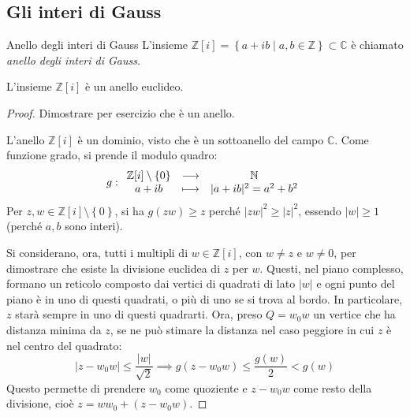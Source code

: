 \documentclass[11pt, a4paper]{scrartcl}
\theoremstyle{definition}
\numberwithin{esempio}{section}
\theoremstyle{definition}
\numberwithin{obs}{section}
\numberwithin{nota}{section}
\numberwithin{equation}{subsection}
\begin{document}
\subsection{Gli interi di Gauss}
\begin{definizione}
	{Anello degli interi di Gauss}{}
	L'insieme $\mathbb{Z}[i] = \left\{ a + ib  \mid a,b \in \mathbb{Z} \right\}\subset \mathbb{C} $ \`e chiamato \textit{anello degli interi di Gauss}.
\end{definizione}
\begin{prop}
	{}{}
	L'insieme $\mathbb{Z}[i]$ \`e un anello euclideo.
	\begin{proof}
		{\color{red}Dimostrare per esercizio che \`e un anello.}

		L'anello $\mathbb{Z}[i]$ \`e un dominio, visto che \`e un sottoanello del campo $\mathbb{C}$.
		Come funzione grado, si prende il modulo quadro:
\[
	g : \begin{array}{c c c}
		\mathbb{Z}[i] \setminus\left\{ 0 \right\} & \longrightarrow & \mathbb{N}\\
		a+ib & \longmapsto & \lvert a+ ib  \rvert ^2 = a^2 + b^2
\end{array}
\] 
Per $z,w \in \mathbb{Z}[i] \setminus\left\{ 0 \right\} $, si ha $g(zw) \ge z$ perch\'e $\lvert zw \rvert ^2 \ge \lvert z \rvert ^2$, essendo $\lvert w \rvert \ge 1$ (perch\'e $a,b$ sono interi).

Si considerano, ora, tutti i multipli di $w \in \mathbb{Z}[i]$, con $w\neq z$ e $w \neq 0$, per dimostrare che esiste la divisione euclidea di $z$ per $w$.
Questi, nel piano complesso, formano un reticolo composto dai vertici di quadrati di lato $\lvert w \rvert $ e ogni punto del piano \`e in uno di questi quadrati, o pi\`u di uno se si trova al bordo.
In particolare, $z$ star\`a sempre in uno di questi quadrarti. 
Ora, preso $Q = w_0w$ un vertice che ha distanza minima da $z$, se ne pu\`o stimare la distanza nel caso peggiore in cui $z$ \`e nel centro del quadrato:
\[
\lvert z - w_0w \rvert \le  \frac{\lvert w \rvert }{\sqrt{2} }\implies g(z-w_0w) \le \frac{g(w)}{2}<g(w)
\] 
Questo permette di prendere $w_0$ come quoziente e $z-w_0w$ come resto della divisione, cio\`e $z = ww_0 + (z-w_0w)$.
	\end{proof}
\end{prop}
\end{document}
